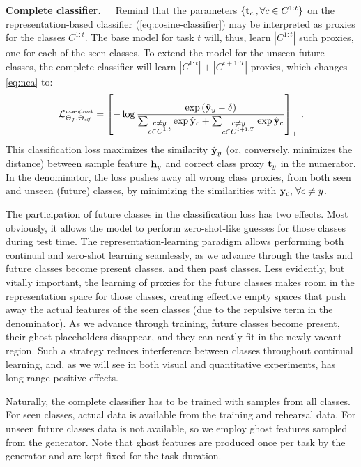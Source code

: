 \label{sec:generator}

\textbf{Complete classifier.~~} Remind that the parameters  $\{\mathbf{t}_c\,,\forall c \in C^{1:t}\}$ on
the representation-based classifier (\autoref{eq:cosine-classifier}) may be interpreted as proxies
for the classes $C^{1:t}$. The base model for task $t$ will, thus, learn $|C^{1:t}|$ such proxies,
one for each of the seen classes. To extend the model for the unseen future classes, the complete
classifier will learn $|C^{1:t}| + |C^{t+1:T}|$ proxies, which changes \autoref{eq:nca} to:
%
\begin{equation}
    \mathcal{L}^\text{\tiny{nca-ghost}}_{\Theta_f,\Theta_{\textit{clf}}} = \left[- \log\frac{\exp\left(\hat{\mathbf{y}}_y - \delta\right)}{\sum_{\substack{c \neq y\\c \in C^{1:t}}} \exp \hat{\mathbf{y}}_{c} + \sum_{\substack{c \neq y\\c \in C^{t+1:T}}} \exp \hat{\mathbf{y}}_{c}} \right]_+ \,.
    \label{eq:nca-ghost}
\end{equation}
%
This classification loss maximizes the similarity $\hat{\mathbf{y}}_y$ (or, conversely, minimizes the distance)
between sample feature $\mathbf{h}_y$ and correct class proxy $\mathbf{t}_y$ in the numerator. In the denominator,
the loss pushes away all wrong class proxies, from both seen and unseen (future) classes, by
minimizing the similarities with $\mathbf{y}_c, \, \forall c \neq y$.

The participation of future classes in the classification loss has two effects. Most obviously, it
allows the model to perform zero-shot-like guesses for those classes during test time. The
representation-learning paradigm allows performing both continual and zero-shot learning seamlessly,
as we advance through the tasks and future classes become present classes, and then past classes.
Less evidently, but vitally important, the learning of proxies for the future classes makes room in
the representation space for those classes, creating effective empty spaces that push away the
actual features of the seen classes (due to the repulsive term in the denominator). As we advance
through training, future classes become present, their ghost placeholders disappear, and they can
neatly fit in the newly vacant region. Such a strategy reduces interference between classes
throughout continual learning, and, as we will see in both visual and quantitative experiments, has
long-range positive effects.

Naturally, the complete classifier has to be trained with samples from all classes. For seen
classes, actual data is available from the training and rehearsal data. For unseen future classes
data is not available, so we employ ghost features sampled from the generator. Note that ghost
features are produced once per task by the generator and are kept fixed for the task duration.
\label{sec:ghost-classifier}

